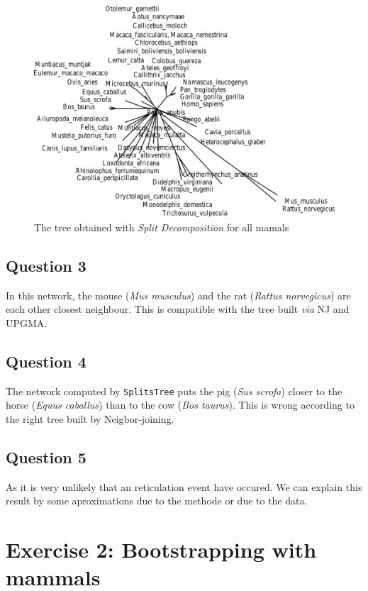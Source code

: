 \documentclass[]{article}
\theoremstyle{definition}
\begin{document}
 \begin{figure}[H]
 	\centering
 	\includegraphics*[scale=0.3]{image/ex2qt2.pdf}
 	\caption{ The tree obtained with \textit{Split Decomposition} for all mamals }
 \end{figure}
 
\subsection{Question 3}

In this network, the mouse (\textit{Mus musculus}) and the rat (\textit{Rattus norvegicus}) are each other closest neighbour. This is compatible with the tree built \textit{via} NJ and UPGMA.

\subsection{Question 4}
The network computed by \texttt{SplitsTree} puts the pig (\textit{Sus scrofa}) closer to the horse (\textit{Equus caballus}) than to the cow (\textit{Bos taurus}). This is wrong according to the right tree built by Neigbor-joining.

\subsection{Question 5}
As it is very unlikely that an reticulation event have occured. We can explain this result by some aproximations due to the methode or due to the data.

\section{Exercise 2: Bootstrapping with mammals}
\end{document}
